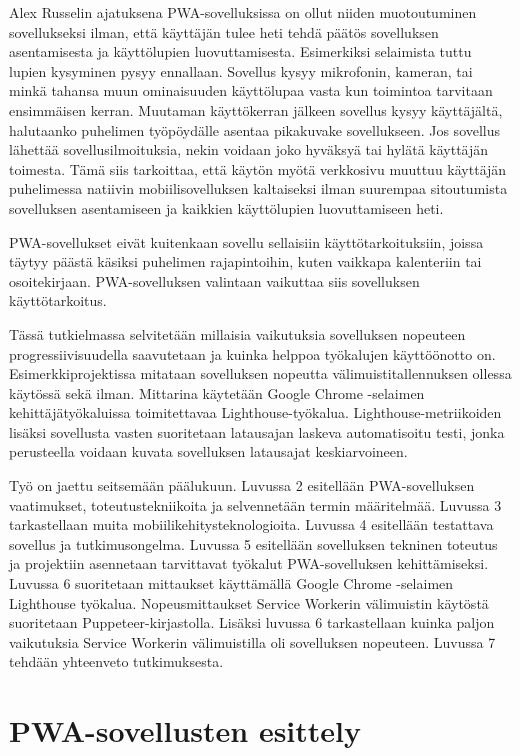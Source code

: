 \documentclass{tktltiki}
\begin{document}
Alex  Russelin ajatuksena \cite{Russell} PWA-sovelluksissa on ollut niiden muotoutuminen sovellukseksi ilman, että käyttäjän tulee heti tehdä päätös sovelluksen asentamisesta ja käyttölupien luovuttamisesta. Esimerkiksi selaimista tuttu lupien kysyminen pysyy ennallaan. Sovellus kysyy mikrofonin, kameran, tai minkä tahansa muun ominaisuuden käyttölupaa vasta kun toimintoa tarvitaan ensimmäisen kerran. Muutaman käyttökerran jälkeen sovellus kysyy käyttäjältä, halutaanko puhelimen työpöydälle asentaa pikakuvake sovellukseen. Jos sovellus lähettää sovellusilmoituksia, nekin voidaan joko hyväksyä tai hylätä käyttäjän toimesta. Tämä siis tarkoittaa, että käytön myötä verkkosivu muuttuu käyttäjän puhelimessa natiivin mobiilisovelluksen kaltaiseksi ilman suurempaa sitoutumista sovelluksen asentamiseen ja kaikkien käyttölupien luovuttamiseen heti. 

PWA-sovellukset eivät kuitenkaan sovellu sellaisiin käyttötarkoituksiin, joissa täytyy päästä käsiksi puhelimen rajapintoihin, kuten vaikkapa kalenteriin tai osoitekirjaan. PWA-sovelluksen valintaan vaikuttaa siis sovelluksen käyttötarkoitus. 

Tässä tutkielmassa selvitetään millaisia vaikutuksia sovelluksen nopeuteen progressiivisuudella saavutetaan ja kuinka helppoa työkalujen käyttöönotto on. Esimerkkiprojektissa mitataan sovelluksen nopeutta välimuistitallennuksen ollessa käytössä sekä ilman. Mittarina käytetään Google Chrome -selaimen kehittäjätyökaluissa toimitettavaa Lighthouse-työkalua. Lighthouse-metriikoiden lisäksi sovellusta vasten suoritetaan latausajan laskeva automatisoitu testi, jonka perusteella voidaan kuvata sovelluksen latausajat keskiarvoineen. 

Työ on jaettu seitsemään päälukuun. Luvussa 2 esitellään PWA-sovelluksen vaatimukset, toteutustekniikoita ja selvennetään termin määritelmää. Luvussa 3 tarkastellaan muita mobiilikehitysteknologioita. Luvussa 4 esitellään testattava sovellus ja tutkimusongelma. Luvussa 5 esitellään sovelluksen tekninen toteutus ja projektiin asennetaan tarvittavat työkalut PWA-sovelluksen kehittämiseksi. Luvussa 6 suoritetaan mittaukset käyttämällä Google Chrome -selaimen Lighthouse työkalua. Nopeusmittaukset Service Workerin välimuistin käytöstä suoritetaan Puppeteer-kirjastolla. Lisäksi luvussa 6 tarkastellaan kuinka paljon vaikutuksia Service Workerin välimuistilla oli sovelluksen nopeuteen. Luvussa 7 tehdään yhteenveto tutkimuksesta.

\newpage
\section{PWA-sovellusten esittely}
\end{document}

